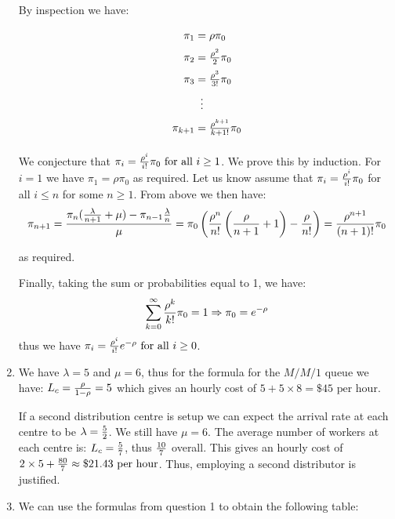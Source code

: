 \documentclass[12pt]{article}
\begin{document}
\begin{enumerate}
By inspection we have:

$$\begin{array}{@{}r@{\;}c@{\;}l@{}}
\pi_1&=&\rho\pi_0\\[2mm]
\pi_2&=&{\rho^2\over 2}\pi_0\\[2mm]
\pi_3&=&{\rho^3\over 3!}\pi_0\\[2mm]
&\vdots&\\[2mm]
\pi_{k+1}&=&{\rho^{k+1}\over {k+1}!}\pi_0\\[2mm]
\end{array}$$

We conjecture that $\pi_i={\rho^i\over i!}\pi_0\text{ for all }i\geq1$. We prove this by induction. For $i=1$ we have $\pi_1=\rho\pi_0$ as required. Let us know assume that $\pi_i={\rho^i\over i!}\pi_0$ for all $i\leq n$ for some $n\geq 1$. From above we then have:
$$\pi_{n+1}={\pi_{n}({\lambda\over n+1}+\mu)-\pi_{n-1}{\lambda\over n}\over \mu}=\pi_0\left({\rho^n\over n!}\left({\rho\over n+1}+1\right)-{\rho\over n!}\right)={\rho^{n+1}\over (n+1)!}\pi_0$$

as required.

Finally, taking the sum or probabilities equal to 1, we have:
$$\sum_{k=0}^{\infty}{\rho^k\over k!}\pi_0=1\Rightarrow\pi_0=e^{-\rho}$$
thus we have $\pi_i={\rho^i\over i!}e^{-\rho}\text{ for all }i\geq0$.

\item We have $\lambda=5$ and $\mu=6$, thus for the formula for the $M/M/1$ queue we have:
$L_c={\rho\over1-\rho}=5$ which gives an hourly cost of $5+5\times8=\$45\text{ per hour}$.

If a second distribution centre is setup we can expect the arrival rate at each centre to be $\lambda={5\over 2}$. We still have $\mu=6$. The average number of workers at each centre is: $L_c={5\over7}$, thus ${10\over 7}$ overall. This gives an hourly cost of $2\times5+{80\over7}\approx\$21.43\text{ per hour}$. Thus, employing a second distributor is justified.


\item We can use the formulas from question 1 to obtain the following table:



\end{enumerate}
\end{document}
